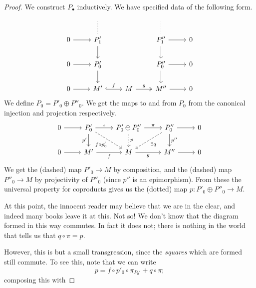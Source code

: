 \documentclass[main.tex]{subfiles}
\begin{document}
\begin{proof}
  We construct $P_{\bullet}$ inductively. We have specified data of the following form.
  \begin{equation*}
    \begin{tikzcd}
      \
      & \
      \arrow[d, dotted, no head]
      & \
      & \
      \arrow[d, dotted, no head]
      & \
      \\
      0
      \arrow[r]
      & P'_{1}
      \arrow[d]
      && P''_{1}
      \arrow[r]
      \arrow[d]
      & 0
      \\
      0
      \arrow[r]
      & P'_{0}
      \arrow[d]
      && P''_{0}
      \arrow[r]
      \arrow[d]
      & 0
      \\
      0
      \arrow[r]
      & M'
      \arrow[r, hook, "f"]
      & M
      \arrow[r, two heads, "g"]
      & M''
      \arrow[r]
      & 0
    \end{tikzcd}
  \end{equation*}
  We define $P_{0} = P'_{0} \oplus P''_{0}$. We get the maps to and from $P_{0}$ from the canonical injection and projection respectively.
  \begin{equation*}
    \begin{tikzcd}
      0
      \arrow[r]
      & P'_{0}
      \arrow[r, "\iota"]
      \arrow[dr, dashed, swap, "f \circ p'_{0}"]
      \arrow[d, swap, "p'"]
      & P'_{0} \oplus P''_{0}
      \arrow[r, "\pi"]
      \arrow[d, dotted, "p"]
      & P''_{0}
      \arrow[r]
      \arrow[d, "p''"]
      \arrow[dl, dashed, "\exists q"]
      & 0
      \\
      0
      \arrow[r]
      & M'
      \arrow[r, swap, "f"]
      & M
      \arrow[r, swap, "g"]
      & M''
      \arrow[r]
      & 0
    \end{tikzcd}
  \end{equation*}
  We get the (dashed) map $P'_{0} \to M$ by composition, and the (dashed) map $P''_{0} \to M$ by projectivity of $P''_{0}$ (since $p''$ is an epimorphism). From these the universal property for coproducts gives us the (dotted) map $p\colon P'_{0} \oplus P''_{0} \to M$.

  At this point, the innocent reader may believe that we are in the clear, and indeed many books leave it at this. Not so! We don't know that the diagram formed in this way commutes. In fact it does not; there is nothing in the world that tells us that $q \circ \pi = p$.

  However, this is but a small transgression, since the \emph{squares} which are formed still commute. To see this, note that we can write
  \begin{equation*}
    p = f \circ p'_{0} \circ \pi_{P_{0}'} + q \circ \pi;
  \end{equation*}
  composing this with


\end{proof}
\end{document}

